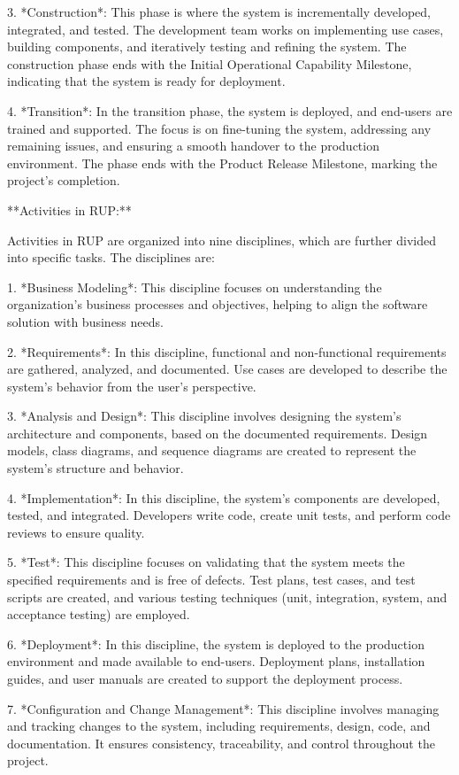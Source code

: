 \documentclass{article}
\begin{document}
3. *Construction*: This phase is where the system is incrementally developed, integrated, and tested. The development team works on implementing use cases, building components, and iteratively testing and refining the system. The construction phase ends with the Initial Operational Capability Milestone, indicating that the system is ready for deployment.

4. *Transition*: In the transition phase, the system is deployed, and end-users are trained and supported. The focus is on fine-tuning the system, addressing any remaining issues, and ensuring a smooth handover to the production environment. The phase ends with the Product Release Milestone, marking the project's completion.

**Activities in RUP:**

Activities in RUP are organized into nine disciplines, which are further divided into specific tasks. The disciplines are:

1. *Business Modeling*: This discipline focuses on understanding the organization's business processes and objectives, helping to align the software solution with business needs.

2. *Requirements*: In this discipline, functional and non-functional requirements are gathered, analyzed, and documented. Use cases are developed to describe the system's behavior from the user's perspective.

3. *Analysis and Design*: This discipline involves designing the system's architecture and components, based on the documented requirements. Design models, class diagrams, and sequence diagrams are created to represent the system's structure and behavior.

4. *Implementation*: In this discipline, the system's components are developed, tested, and integrated. Developers write code, create unit tests, and perform code reviews to ensure quality.

5. *Test*: This discipline focuses on validating that the system meets the specified requirements and is free of defects. Test plans, test cases, and test scripts are created, and various testing techniques (unit, integration, system, and acceptance testing) are employed.

6. *Deployment*: In this discipline, the system is deployed to the production environment and made available to end-users. Deployment plans, installation guides, and user manuals are created to support the deployment process.

7. *Configuration and Change Management*: This discipline involves managing and tracking changes to the system, including requirements, design, code, and documentation. It ensures consistency, traceability, and control throughout the project.
\end{document}
